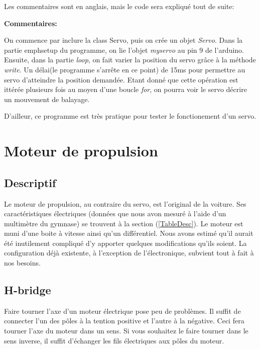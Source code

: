 \documentclass[a4paper,12pt]{article}
\begin{document}
{Les commentaires sont en anglais, mais le code sera expliqu\'e tout de suite:



\textbf{Commentaires:}

On commence par inclure la class Servo, puis on cr\'ee un objet
\emph{Servo}. Dans la partie emph{setup} du programme, on lie l'objet
\emph{myservo} au pin 9 de l'arduino. Ensuite, dans la partie \emph{loop}, on
fait varier la position du servo gr\^ace \`a la m\'ethode \emph{write}. Un
d\'elai(le programme s'arr\^ete en ce point) de 15ms pour permettre au servo
d'atteindre la position demand\'ee. Etant donn\'e que cette op\'eration est
itt\'er\'ee plusieurs fois au moyen d'une boucle \emph{for}, on pourra voir le
servo d\'ecrire un mouvement de balayage.

D'ailleur, ce programme est tr\`es pratique pour tester le fonctionement d'un servo. 

\section{Moteur de propulsion}

\subsection{Descriptif}

Le moteur de propulsion, au contraire du servo, est l'original de la
voiture. Ses caract\'eristiques \'electriques (donn\'ees que nous avon mesur\'e \`a l'aide
d'un multim\`etre du gymnase) se trouvent \`a la section
(\ref{TableDesc}). Le moteur est muni d'une boite \`a vitesse ainsi qu'un
diff\'erentiel. Nous avons estim\'e qu'il aurait \'et\'e
inutilement compliqu\'e d'y apporter quelques modifications qu'ils soient. La
configuration d\'ej\`a existente, \`a l'exception de l'\'electronique,
subvient tout \`a fait \`a nos besoins.  

\subsection{H-bridge}
Faire tourner l'axe d'un moteur \'electrique pose peu de probl\`emes. Il
suffit de connecter l'un des p\^oles \`a la tention positive et l'autre \`a la
n\'egative. Ceci fera tourner l'axe du moteur dans un sens. Si vous souhaitez le
faire tourner dans le sens inverse, il suffit d'\'echanger les fils
\'electriques aux p\^oles du moteur.

}
\end{document}
